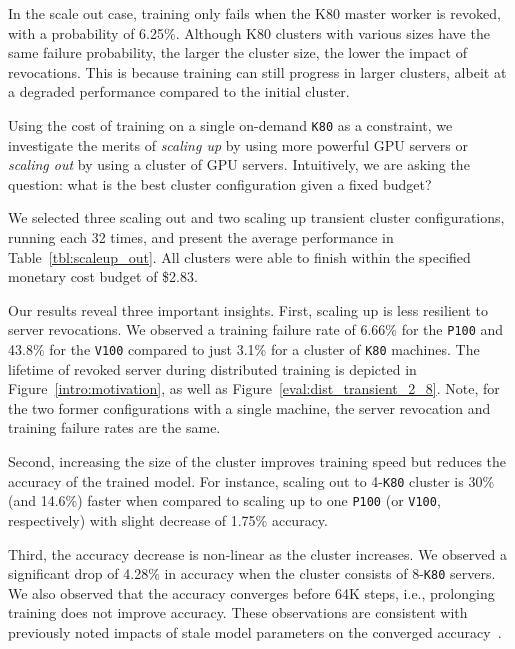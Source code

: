 \begin{table}[t]
{%
In the scale out case, training only fails when the K80 master worker is
  revoked, with a probability of 6.25\%. Although K80 clusters with various
  sizes have the same failure probability, the larger the cluster size, the
  lower the impact of revocations. This is because  training can still
  progress in larger clusters, albeit at a degraded performance compared to the initial cluster.}
\label{tbl:scaleup_out}
\end{table}


Using the cost of training on a single on-demand \texttt{K80} as a
constraint, we investigate the merits of 
\emph{scaling up} by using more powerful GPU servers or \emph{scaling out} by using a cluster of GPU servers.
Intuitively, we are asking the question: what is the best
cluster configuration given a fixed budget?

We selected three scaling out and two scaling up transient cluster configurations,
running each 32 times, and present the average performance in
Table~\ref{tbl:scaleup_out}. All clusters were able to finish within the
specified monetary cost budget of \$2.83.  


Our results reveal three important insights. First, scaling up is less
resilient to server revocations. We observed a training failure rate of 6.66\%
for the \texttt{P100} and 43.8\% for the \texttt{V100} compared to just 3.1\% for
a cluster of \texttt{K80} machines. The lifetime of revoked server during distributed
training is depicted in Figure~\ref{intro:motivation}, as well as Figure~\ref{eval:dist_transient_2_8}. 
Note, for the two former configurations with a single machine, the server revocation and training failure rates are the
same. 

Second, increasing the size of the cluster
improves training speed but reduces the accuracy of the trained model. For
instance, scaling out to 4-\texttt{K80} cluster is 30\% (and 14.6\%) faster
when compared to scaling up to one \texttt{P100} (or \texttt{V100},
respectively) with slight decrease of 1.75\% accuracy.  

Third, the accuracy decrease is non-linear as the cluster increases. We
observed a significant drop of 4.28\% in accuracy when the cluster consists of 8-\texttt{K80} servers.  
We also observed that the accuracy converges before 64K steps, i.e.,
prolonging training does not improve accuracy.  These observations are
consistent with previously noted impacts of stale model parameters on the
converged accuracy~\cite{stale1,stale2,stale3,stale4}.  

